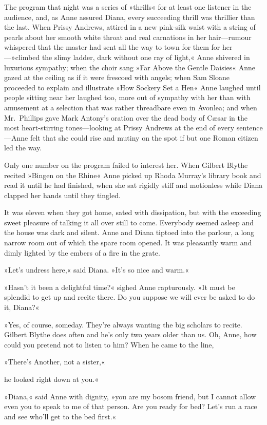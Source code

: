 The program that night was a series of »thrills« for at least one listener in the audience, and, as Anne assured Diana, every succeeding thrill was thrillier than the last. When Prissy Andrews, attired in a new pink-silk waist with a string of pearls about her smooth white throat and real carnations in her hair—rumour whispered that the master had sent all the way to town for them for her—»climbed the slimy ladder, dark without one ray of light,« Anne shivered in luxurious sympathy; when the choir sang »Far Above the Gentle Daisies« Anne gazed at the ceiling as if it were frescoed with angels; when Sam Sloane proceeded to explain and illustrate »How Sockery Set a Hen« Anne laughed until people sitting near her laughed too, more out of sympathy with her than with amusement at a selection that was rather threadbare even in Avonlea; and when Mr.~Phillips gave Mark Antony's oration over the dead body of Cæsar in the most heart-stirring tones—looking at Prissy Andrews at the end of every sentence—Anne felt that she could rise and mutiny on the spot if but one Roman citizen led the way.

Only one number on the program failed to interest her. When Gilbert Blythe recited »Bingen on the Rhine« Anne picked up Rhoda Murray's library book and read it until he had finished, when she sat rigidly stiff and motionless while Diana clapped her hands until they tingled.

It was eleven when they got home, sated with dissipation, but with the exceeding sweet pleasure of talking it all over still to come. Everybody seemed asleep and the house was dark and silent. Anne and Diana tiptoed into the parlour, a long narrow room out of which the spare room opened. It was pleasantly warm and dimly lighted by the embers of a fire in the grate.

»Let's undress here,« said Diana. »It's so nice and warm.«

»Hasn't it been a delightful time?« sighed Anne rapturously. »It must be splendid to get up and recite there. Do you suppose we will ever be asked to do it, Diana?«

»Yes, of course, someday. They're always wanting the big scholars to recite. Gilbert Blythe does often and he's only two years older than us. Oh, Anne, how could you pretend not to listen to him? When he came to the line,

»There's Another, not a sister,«

he looked right down at you.«

»Diana,« said Anne with dignity, »you are my bosom friend, but I cannot allow even you to speak to me of that person. Are you ready for bed? Let's run a race and see who'll get to the bed first.«

